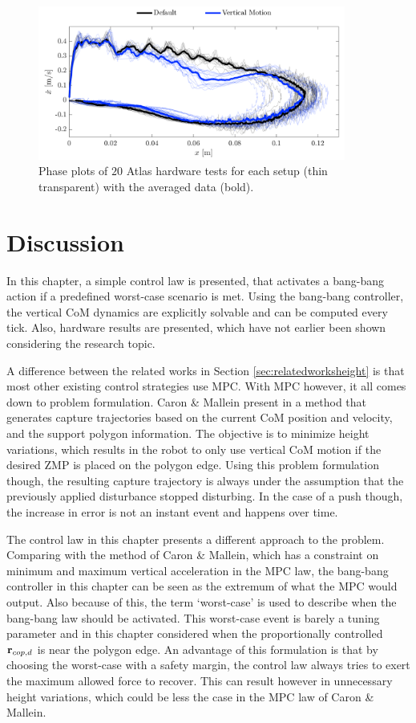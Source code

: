 \begin{figure}
\centering
\includegraphics[width=0.9\textwidth]{STYLESTUFF/atlasphaseHW.png}
\caption{Phase plots of $20$ Atlas hardware tests for each setup (thin transparent) with the averaged data (bold).}
\label{fig:atlasphaseHW}
\end{figure}

\section{Discussion}
In this chapter, a simple control law is presented, that activates a bang-bang action if a predefined worst-case scenario is met. Using the bang-bang controller, the vertical \ac{CoM} dynamics are explicitly solvable and can be computed every tick. Also, hardware results are presented, which have not earlier been shown considering the research topic. 

A difference between the related works in Section \ref{sec:relatedworksheight} is that most other existing control strategies use \ac{MPC}. With \ac{MPC} however, it all comes down to problem formulation. Caron \& Mallein present in \cite{caron2018balance} a method that generates capture trajectories based on the current \ac{CoM} position and velocity, and the support polygon information. The objective is to minimize height variations, which results in the robot to only use vertical \ac{CoM} motion if the desired \ac{ZMP} is placed on the polygon edge. Using this problem formulation though, the resulting capture trajectory is always under the assumption that the previously applied disturbance stopped disturbing. In the case of a push though, the increase in error is not an instant event and happens over time.

The control law in this chapter presents a different approach to the problem. Comparing with the method of Caron \& Mallein, which has a constraint on minimum and maximum vertical acceleration in the \ac{MPC} law, the bang-bang controller in this chapter can be seen as the extremum of what the \ac{MPC} would output. Also because of this, the term `worst-case' is used to describe when the bang-bang law should be activated. This worst-case event is barely a tuning parameter and in this chapter considered when the proportionally controlled $\mathbf{r}_{cop,d}$ is near the polygon edge. An advantage of this formulation is that by choosing the worst-case with a safety margin, the control law always tries to exert the maximum allowed force to recover. This can result however in unnecessary height variations, which could be less the case in the \ac{MPC} law of Caron \& Mallein.

